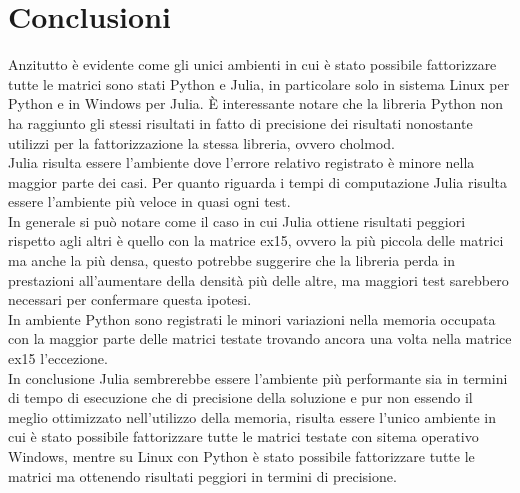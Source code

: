 \documentclass[a4paper, 12pt]{article}
\begin{document}
    \section{Conclusioni}
        Anzitutto è evidente come gli unici ambienti in cui è stato possibile fattorizzare tutte le matrici sono 
        stati Python e Julia, in particolare solo in sistema Linux per Python e in Windows per Julia. 
        \`E interessante notare che la libreria Python non ha raggiunto gli stessi risultati in fatto di precisione
        dei risultati nonostante utilizzi per la fattorizzazione la stessa libreria, ovvero cholmod.\\
        Julia risulta essere l'ambiente dove l'errore relativo registrato è minore nella maggior parte 
        dei casi. 
        Per quanto riguarda i tempi di computazione Julia risulta essere l'ambiente più veloce in quasi ogni test.\\
        In generale si può notare come il caso in cui Julia ottiene risultati peggiori rispetto agli altri è quello 
        con la matrice ex15, ovvero la più piccola delle matrici ma anche la più densa, questo potrebbe suggerire 
        che la libreria perda in prestazioni all'aumentare della densità più delle altre, ma maggiori test sarebbero
        necessari per confermare questa ipotesi.\\
        In ambiente Python sono registrati le minori variazioni nella memoria occupata con la maggior parte delle
        matrici testate trovando ancora una volta nella matrice ex15 l'eccezione.\\
        In conclusione Julia sembrerebbe essere l'ambiente più performante sia in termini di tempo di esecuzione che
        di precisione della soluzione e pur non essendo il meglio ottimizzato nell'utilizzo della memoria, risulta
        essere l'unico ambiente in cui è stato possibile fattorizzare tutte le matrici testate con sitema operativo
        Windows, mentre su Linux con Python è stato possibile fattorizzare tutte le matrici ma ottenendo risultati
        peggiori in termini di precisione.

            
                
\end{document}
